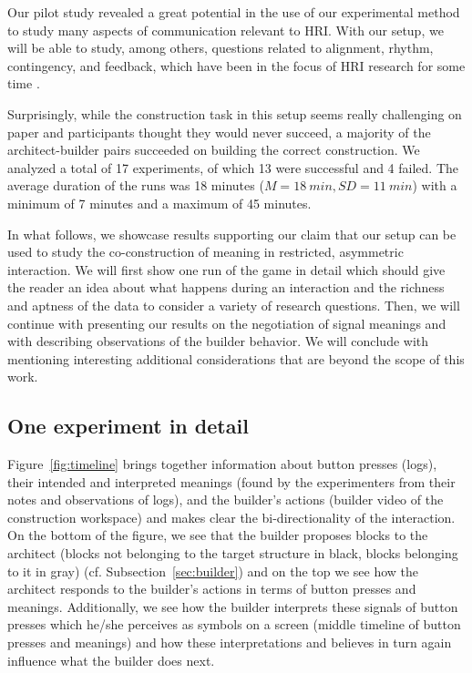 Our pilot study revealed a great potential in the use of our experimental method to study many aspects of communication relevant to HRI. With our setup, we will be able to study, among others, questions related to alignment, rhythm, contingency, and feedback, which have been in the focus of HRI research for some time \cite{kopp2010social,michalowski2007dancing,fischer2013impact,vollmer2014robots,pitsch2013robot,wrede2010appropriate}.

Surprisingly, while the construction task in this setup seems really challenging on paper and participants thought they would never succeed, a majority of the architect-builder pairs succeeded on building the correct construction. We analyzed a total of 17 experiments, of which 13 were successful and 4 failed. The average duration of the runs was 18 minutes ($M = 18~min, SD = 11~min$) with a minimum of 7 minutes and a maximum of 45 minutes.

In what follows, we showcase results supporting our claim that our setup can be used to study the co-construction of meaning in restricted, asymmetric interaction. We will first show one run of the game in detail which should give the reader an idea about what happens during an interaction and the richness and aptness of the data to consider a variety of research questions. Then, we will continue with presenting our results on the negotiation of signal meanings and with describing observations of the builder behavior. We will conclude with mentioning interesting additional considerations that are beyond the scope of this work.

\subsection{One experiment in detail} 
\label{sec:case}

Figure~\ref{fig:timeline} brings together information about button presses (logs), their intended and interpreted meanings (found by the experimenters from their notes and observations of logs), and the builder's actions (builder video of the construction workspace) and makes clear the bi-directionality of the interaction. On the bottom of the figure, we see that the builder proposes blocks to the architect (blocks not belonging to the target structure in black, blocks belonging to it in gray) (cf. Subsection~\ref{sec:builder}) and on the top we see how the architect responds to the builder's actions in terms of button presses and meanings. Additionally, we see how the builder interprets these signals of button presses which he/she perceives as symbols on a screen (middle timeline of button presses and meanings) and how these interpretations and believes in turn again influence what the builder does next.

